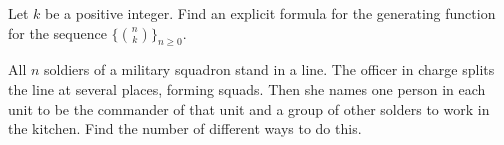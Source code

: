 \documentclass[addpoints]{exam}
\begin{document}
  \pagestyle{headandfoot}
  \runningheadrule

  \firstpagefooter{}{}{}
  \runningfooter{}{}{}
  \begin{flushright}

    \vspace{0.2in}
  \end{flushright}

  \begin{questions}
    \question[10]
      Let $k$ be a positive integer.
			Find an explicit formula for the generating function for the sequence
			$\{\binom{n}{k}\}_{n \ge 0}$.

      \begin{solution}[\stretch{1}]
      \end{solution}
      \newpage
    \question
      All $n$ soldiers of a military squadron stand in a line. The officer in charge
			splits the line at several places, forming squads. Then she names
			one person in each unit to be the commander of that unit and a group of other
			solders to work in the kitchen. Find the number of different ways to do this.

      \begin{solution}[\stretch{1}]
      \end{solution}
      \newpage
  \end{questions}
\end{document}
